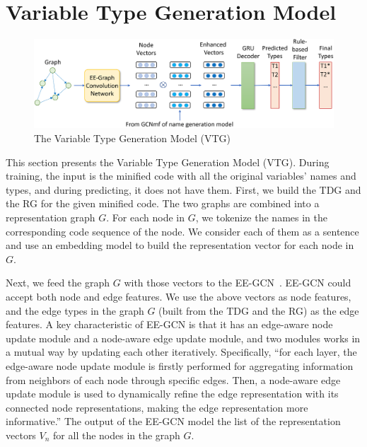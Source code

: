 \section{Variable Type Generation Model}
\label{sec:type-gen}

\begin{figure}[ht]
	\begin{center}
	  \includegraphics[width=5in]{figures/type-gen-model}
          \vspace{-6pt}
		\caption{The Variable Type Generation Model (VTG)}
		\label{fig:type-gen}
	\end{center}
\end{figure}

This section presents the Variable Type Generation Model (VTG). During
training, the input is the minified code with all the original
variables’ names and types, and during predicting, it does not have
them. First, we build the TDG and the RG for the given minified code.
The two graphs are combined into a representation graph $G$. For each
node in $G$, we tokenize the names in the corresponding code sequence
of the node. We consider each of them as a sentence and use an
embedding model to build the representation vector for each node in
$G$.

Next, we feed the graph $G$ with those vectors to the
EE-GCN~\cite{ee-gcn}. EE-GCN could accept both node and edge features.
We use the above vectors as node features, and the edge types in the
graph $G$ (built from the TDG and the RG) as the edge features. A key
characteristic of EE-GCN is that it has an edge-aware node update
module and a node-aware edge update module, and two modules works in a
mutual way by updating each other iteratively. Specifically, ``for
each layer, the edge-aware node update module is firstly performed for
aggregating information from neighbors of each node through specific
edges. Then, a node-aware edge update module is used to dynamically
refine the edge representation with its connected node
representations, making the edge representation more informative.''
The output of the EE-GCN model the list of the representation vectors
$V_n$ for all the nodes in the graph $G$.

